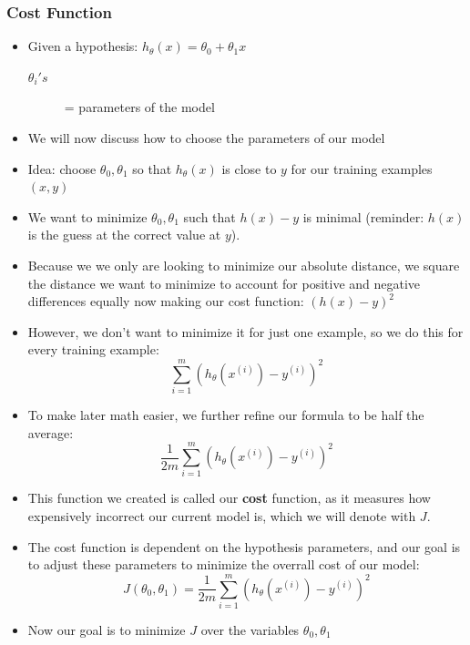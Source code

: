 \subsubsection{Cost Function}
\begin{itemize}[--]
	\item Given a hypothesis: $h_\theta (x) = \theta_0 + \theta_1 x$
	\begin{description}
		\item[$\theta_i's$] = parameters of the model
	\end{description}

	\item We will now discuss how to choose the parameters of our model
	\item Idea: choose $\theta_0, \theta_1$ so that $h_\theta (x)$ is close to $y$ for our training examples $(x,y)$
	\item We want to minimize $\theta_0, \theta_1$ such that $h(x) - y$ is minimal (reminder: $h(x)$ is the guess at the correct value at $y$).
	\item Because we we only are looking to minimize our absolute distance, we square the distance we want to minimize to account for positive and negative differences equally now making our cost function: $(h(x)-y)^2$
	\item However, we don't want to minimize it for just one example, so we do this for every training example: $$\sum_{i=1}^{m}(h_\theta (x^{(i)}) - y^{(i)})^2$$
	\item To make later math easier, we further refine our formula to be half the average: $$\frac{1}{2m}\sum_{i=1}^{m}(h_\theta (x^{(i)}) - y^{(i)})^2$$
	\item This function we created is called our \textbf{cost} function, as it measures how expensively incorrect our current model is, which we will denote with $J$. 
	\item The cost function is dependent on the hypothesis parameters, and our goal is to adjust these parameters to minimize the overrall cost of our model: $$J(\theta_0, \theta_1) = \frac{1}{2m}\sum_{i=1}^{m}(h_\theta (x^{(i)}) - y^{(i)})^2$$
	\item Now our goal is to minimize $J$ over the variables $\theta_0, \theta_1$
\end{itemize}

